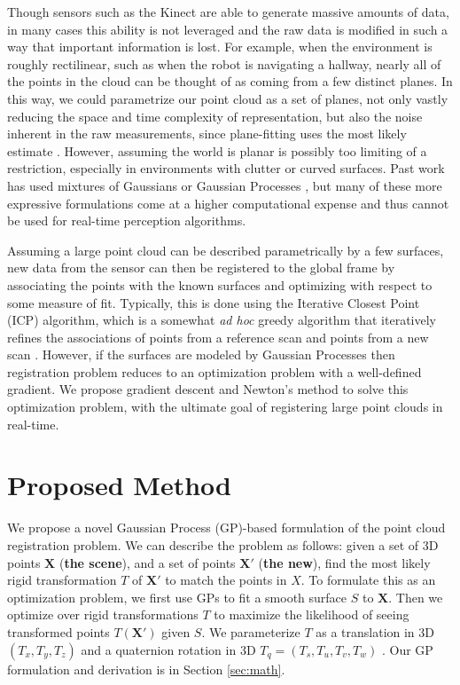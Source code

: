 \documentclass{article} %
\begin{document}
Though sensors such as the Kinect are able to generate massive amounts of data, in many cases this ability is not leveraged and the raw data is modified in such a way that important information is lost. For example, when the environment is roughly rectilinear, such as when the robot is navigating a hallway, nearly all of the points in the cloud can be thought of as coming from a few distinct planes. In this way, we could parametrize our point cloud as a set of planes, not only vastly reducing the space and time complexity of representation, but also the noise inherent in the raw measurements, since plane-fitting uses the most likely estimate \cite{martin_real-time_2002}\cite{liu_using_2001}\cite{thrun_real-time_2004}. However, assuming the world is planar is possibly too limiting of a restriction, especially in environments with clutter or curved surfaces. Past work has used mixtures of Gaussians \cite{tsin2004correlation} \cite{jian2005robust} or Gaussian Processes \cite{plagemann2008nonstationary}, but many of these more expressive formulations come at a higher computational expense and thus cannot be used for real-time perception algorithms.

Assuming a large point cloud can be described parametrically by a few surfaces, new data from the sensor can then be registered to the global frame by associating the points with the known surfaces and optimizing with respect to some measure of fit. Typically, this is done using the Iterative Closest Point (ICP) algorithm, which is a somewhat \emph{ad hoc} greedy algorithm that iteratively refines the associations of points from a reference scan and points from a new scan \cite{besl_method_1992}. However, if the surfaces are modeled by Gaussian Processes then registration problem reduces to an optimization problem with a well-defined gradient. We propose gradient descent and Newton's method to solve this optimization problem, with the ultimate goal of registering large point clouds in real-time. 


\section{Proposed Method}

We propose a novel Gaussian Process (GP)-based formulation of the point cloud registration problem.
We can describe the problem as follows: given a set of 3D points $\mathbf{X}$ ({\bf the scene}), and a set of points $\mathbf{X'}$ ({\bf the new}), find the most likely rigid transformation $T$ of $\mathbf{X'}$ to match the points in $X$. 
To formulate this as an optimization problem, we first use GPs to fit a smooth surface $S$ to $\mathbf{X}$. Then we optimize over
rigid transformations $T$ to maximize the likelihood of seeing transformed points $T(\mathbf{X'})$ given $S$. We parameterize $T$ as a translation in 3D $(T_x, T_y, T_z)$ and a quaternion rotation in 3D $T_q = (T_s, T_u, T_v, T_w)$ . Our GP formulation and derivation is in Section \ref{sec:math}.
\end{document}
